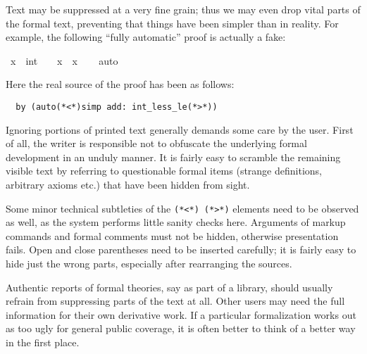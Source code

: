\begin{isabellebody}
\begin{isamarkuptext}
  \medskip

  Text may be suppressed at a very fine grain; thus we may even drop
  vital parts of the formal text, preventing that things have been
  simpler than in reality.  For example, the following ``fully
  automatic'' proof is actually a fake:%
\end{isamarkuptext}%
\isamarkuptrue%
\ {\isachardoublequote}x\ {\isasymnoteq}\ {\isacharparenleft}{}{\isacharcolon}{\isacharcolon}int{\isacharparenright}\ {\isasymLongrightarrow}\ {}\ {\isacharless}\ x\ {\isacharasterisk}\ x{\isachardoublequote}\isanewline
\ \ \isamarkupfalse%
\ {\isacharparenleft}auto{\isacharparenright}\isamarkupfalse%
%
\begin{isamarkuptext}%
\noindent Here the real source of the proof has been as follows:

\begin{verbatim}
  by (auto(*<*)simp add: int_less_le(*>*))
\end{verbatim} %

  \medskip Ignoring portions of printed text generally demands some
  care by the user.  First of all, the writer is responsible not to
  obfuscate the underlying formal development in an unduly manner.  It
  is fairly easy to scramble the remaining visible text by referring
  to questionable formal items (strange definitions, arbitrary axioms
  etc.) that have been hidden from sight.
  
  Some minor technical subtleties of the
  \verb,(,\verb,*,\verb,<,\verb,*,\verb,),~\verb,(,\verb,*,\verb,>,\verb,*,\verb,),
  elements need to be observed as well, as the system performs little
  sanity checks here.  Arguments of markup commands and formal
  comments must not be hidden, otherwise presentation fails.  Open and
  close parentheses need to be inserted carefully; it is fairly easy
  to hide just the wrong parts, especially after rearranging the
  sources.

  \medskip Authentic reports of formal theories, say as part of a
  library, should usually refrain from suppressing parts of the text
  at all.  Other users may need the full information for their own
  derivative work.  If a particular formalization works out as too
  ugly for general public coverage, it is often better to think of a
  better way in the first place.%
\end{isamarkuptext}%
\isamarkuptrue%
\isamarkupfalse%
\end{isabellebody}%
